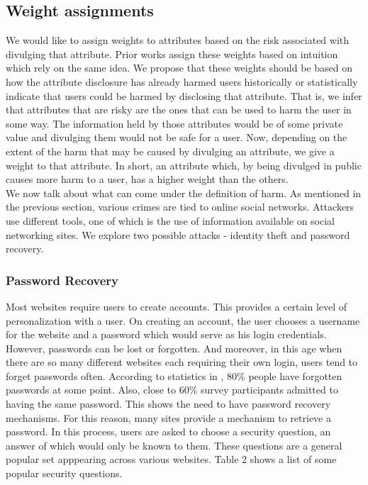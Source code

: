\documentclass[10pt,conference]{IEEEtran}
\begin{document}
\subsection{Weight assignments}
We would like to assign weights to attributes based on the risk associated with divulging that attribute. Prior works assign these weights based on intuition which rely on the same idea. We propose that these weights should be based on how the attribute disclosure has already harmed users historically or statistically indicate that users could be harmed by disclosing that attribute. That is, we infer that attributes that are risky are the ones that can be used to harm the user in some way. The information held by those attributes would be of some private value and divulging them would not be safe for a user. Now, depending on the extent of the harm that may be caused by divulging an attribute, we give a weight to that attribute. In short, an attribute which, by being divulged in public causes more harm to a user, has a higher weight than the others. \\

We now talk about what can come under the definition of harm. As mentioned in the previous section, various crimes are tied to online social networks. Attackers use different tools, one of which is the use of information available on social networking sites. We explore two possible attacks - identity theft and password recovery.

\subsubsection{Password Recovery}
Most websites require users to create accounts. This provides a certain level of personalization with a user. On creating an account, the user chooses a username for the website and a password which would serve as his login credentials. However, passwords can be lost or forgotten. And moreover, in this age when there are so many different websites each requiring their own login, users tend to forget passwords often. According to statistics in \cite{passwordstats}, 80\% people have forgotten passwords at some point. Also, close to 60\% survey participants admitted to having the same password. This shows the need to have password recovery mechanisms. For this reason, many sites provide a mechanism to retrieve a password. In this process, users are asked to choose a security question, an answer of which would only be known to them. These questions are a general popular set apppearing across various websites. Table 2 shows a list of some popular security questions. 
\end{document}
